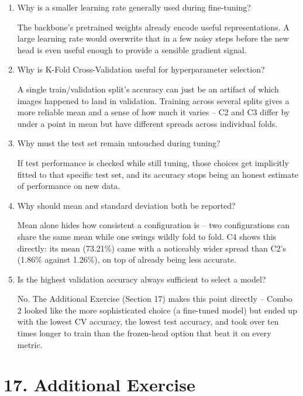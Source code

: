 \documentclass[10pt]{article}
\begin{document}
\begin{enumerate}
\item Why is a smaller learning rate generally used during fine-tuning?

The backbone's pretrained weights already encode useful representations. A
large learning rate would overwrite that in a few noisy steps before the new
head is even useful enough to provide a sensible gradient signal.

\item Why is K-Fold Cross-Validation useful for hyperparameter selection?

A single train/validation split's accuracy can just be an artifact of which
images happened to land in validation. Training across several splits gives
a more reliable mean and a sense of how much it varies -- C2 and C3 differ by
under a point in mean but have different spreads across individual folds.

\item Why must the test set remain untouched during tuning?

If test performance is checked while still tuning, those choices get
implicitly fitted to that specific test set, and its accuracy stops being an
honest estimate of performance on new data.

\item Why should mean and standard deviation both be reported?

Mean alone hides how consistent a configuration is -- two configurations can
share the same mean while one swings wildly fold to fold. C4 shows this
directly: its mean (73.21\%) came with a noticeably wider spread than C2's
(1.86\% against 1.26\%), on top of already being less accurate.

\item Is the highest validation accuracy always sufficient to select a model?

No. The Additional Exercise (Section 17) makes this point directly -- Combo 2
looked like the more sophisticated choice (a fine-tuned model) but ended up
with the lowest CV accuracy, the lowest test accuracy, and took over ten times
longer to train than the frozen-head option that beat it on every metric.

\end{enumerate}

\section*{17. Additional Exercise}
\end{document}
